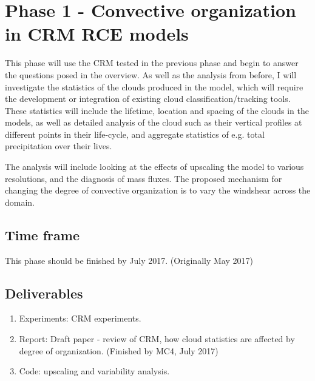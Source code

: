 \documentclass[11pt,a4paper]{article}
\begin{document}
\section*{Phase 1 - Convective organization in CRM RCE models}
This phase will use the CRM tested in the previous phase and begin to answer the questions posed in the overview. As well as the analysis from before, I will investigate the statistics of the clouds produced in the model, which will require the development or integration of existing cloud classification/tracking tools. These statistics will include the lifetime, location and spacing of the clouds in the models, as well as detailed analysis of the cloud such as their vertical profiles at different points in their life-cycle, and aggregate statistics of e.g. total precipitation over their lives.

The analysis will include looking at the effects of upscaling the model to various resolutions, and the diagnosis of mass fluxes. The proposed mechanism for changing the degree of convective organization is to vary the windshear across the domain.

\subsection*{Time frame}

This phase should be finished by July 2017. (Originally May 2017)

\subsection*{Deliverables}
\begin{enumerate}
    \item Experiments: CRM experiments.
    \item Report: Draft paper - review of CRM, how cloud statistics are affected by degree of organization. (Finished by MC4, July 2017)
    \item Code: upscaling and variability analysis.
\end{enumerate}
\end{document}
